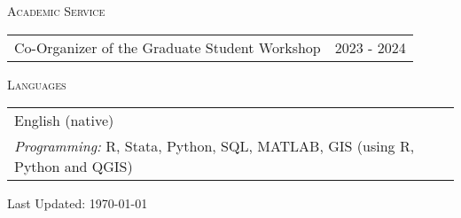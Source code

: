 \documentclass[11pt]{amsart}
\begin{document}
\vspace{0.4cm}
\LARGE
\textsc{Academic Service}
\vspace{0.2cm}

\normalsize
\begin{tabular}{ p{12.5cm} p{5cm}}
Co-Organizer of the Graduate Student Workshop  & 2023 - 2024  \\
\end{tabular}

\vspace{0.4cm}
\LARGE
\textsc{Languages}
\vspace{0.2cm}

\normalsize
\begin{tabular}{ p{17.5cm}}
  English (native)  \\
  \emph{Programming:} R, Stata, Python, SQL, MATLAB, GIS (using R, Python and QGIS)
\end{tabular}





\vspace{0.5cm}
\begin{center}
\tiny Last Updated: \today
\end{center}
\end{document}
